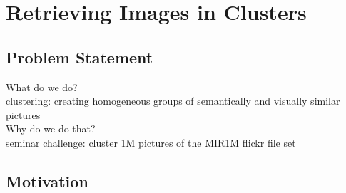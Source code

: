 \section{Retrieving Images in Clusters}
\label{sec_introduction}


\subsection{Problem Statement}

What do we do? \\

clustering: creating homogeneous	groups of semantically and visually similar pictures \\


Why do we do that? \\


seminar challenge: cluster 1M pictures of the MIR1M flickr file set \\



\subsection{Motivation}


